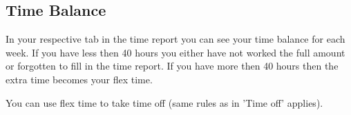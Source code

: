 \subsection*{Time Balance}

    In your respective tab in the time report you can see your time balance for each week. If you have less then 40 hours you either have not worked the full amount or forgotten to fill in the time report. If you have more then 40 hours then the extra time becomes your flex time.
     
    You can use flex time to take time off (same rules as in 'Time off' applies).